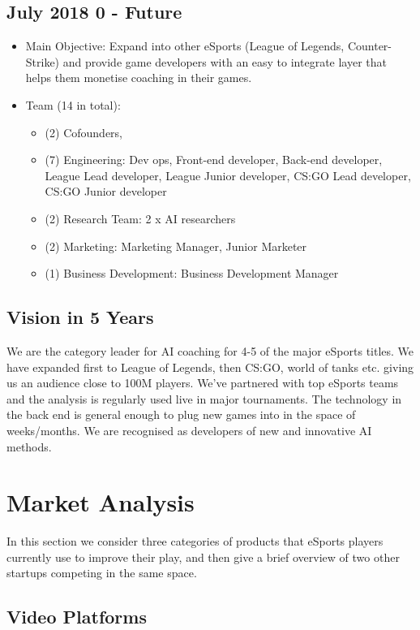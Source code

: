 \documentclass[12pt]{article} %
\let\oldsection\section
\renewcommand\section{\clearpage\oldsection}
\begin{document}
\subsection[{July 2018 - Future}]{July 2018 0 - Future}
\begin{itemize}
\item Main Objective: Expand into other eSports (League of Legends, Counter-Strike) and provide game developers with an easy to integrate layer that helps them monetise coaching in their games.
\item Team (14 in total):  
\begin{itemize}
\item (2) Cofounders, 
\item (7) Engineering: Dev ops, Front-end developer, Back-end developer, League Lead developer, League Junior developer, CS:GO Lead developer, CS:GO Junior developer
\item (2) Research Team: 2 x AI researchers
\item (2) Marketing: Marketing Manager, Junior Marketer
\item (1) Business Development: Business Development Manager\\
\end{itemize}
\end{itemize}

\subsection{Vision in 5 Years} 
We are the category leader for AI coaching for 4-5 of the major eSports titles. We have expanded first to League of Legends, then CS:GO, world of tanks etc. giving us an audience close to 100M players. We've partnered with top eSports teams and the analysis is regularly used live in major tournaments. The technology in the back end is general enough to plug new games into in the space of weeks/months. We are recognised as developers of new and innovative AI methods.

\section{Market Analysis}
 
In this section we consider three categories of products that eSports players currently use to improve their play, and then give a brief overview of two other startups competing in the same space.
 
\subsection{Video Platforms}
 
\end{document}
